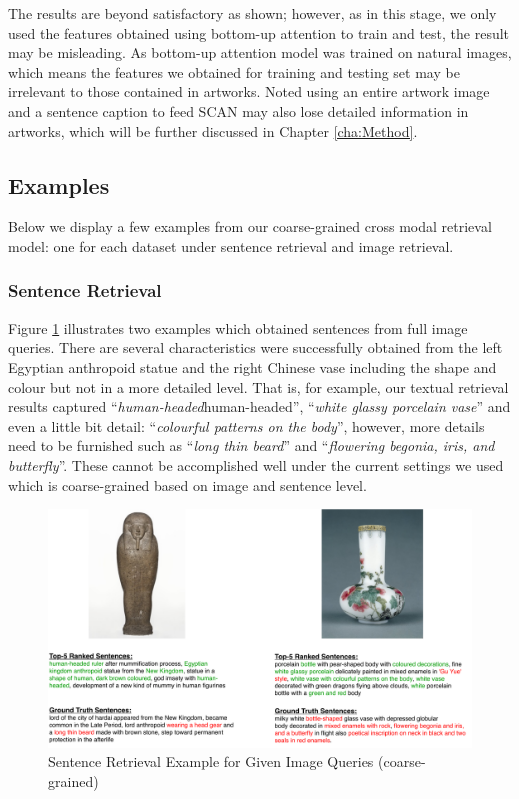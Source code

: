 The results are beyond satisfactory as shown; however, as in this stage, we only used the features obtained using bottom-up attention \cite{bottomup} to train and test, the result may be misleading. As bottom-up attention model was trained on natural images, which means the features we obtained for training and testing set may be irrelevant to those contained in artworks. Noted using an entire artwork image and a sentence caption to feed SCAN may also lose detailed information in artworks, which will be further discussed in Chapter \ref{cha:Method}.

\subsection{Examples}
Below we display a few examples from our coarse-grained cross modal retrieval model: one for each dataset under sentence retrieval and image retrieval.

\subsubsection{Sentence Retrieval}
Figure \ref{fig:scani2t} illustrates two examples which obtained sentences from full image queries. There are several characteristics were successfully obtained from the left Egyptian anthropoid statue and the right Chinese vase including the shape and colour but not in a more detailed level. That is, for example, our textual retrieval results captured ``\textit{human-headed}human-headed'', ``\textit{white glassy porcelain vase}'' and even a little bit detail: ``\textit{colourful patterns on the body}'', however, more details need to be furnished such as ``\textit{long thin beard}'' and ``\textit{flowering begonia, iris, and butterfly}''. These cannot be accomplished well under the current settings we used which is coarse-grained based on image and sentence level.

\begin{figure}[h!]
\centering
\includegraphics[width=\textwidth]{scani2t.pdf}
\caption{Sentence Retrieval Example for Given Image Queries (coarse-grained)}
\label{fig:scani2t}
\end{figure}


